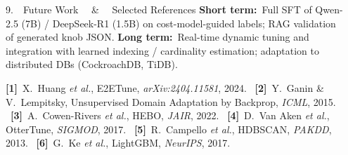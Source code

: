 \documentclass[final,t]{beamer}
\newlength{\sepwidth}
\newlength{\colwidth}
\newcommand{\sepcol}{\begin{column}{\sepwidth}\end{column}}
\begin{document}
\begin{frame}[t,fragile]
\begin{columns}[t]
\begin{column}{\colwidth}
\begin{block}{9.\ \ Future Work \ \ \& \ \ Selected References}
\small
\justifying
\textbf{Short term:}\ Full SFT of Qwen-2.5 (7B) / DeepSeek-R1 (1.5B) on cost-model-guided labels; RAG validation of generated knob JSON. \quad
\textbf{Long term:}\ Real-time dynamic tuning and integration with learned indexing / cardinality estimation; adaptation to distributed DBs (CockroachDB, TiDB).

\vspace{0.3em}
\fontsize{11}{13}\selectfont
\textbf{[1]}\ X.\ Huang \emph{et al.}, E2ETune, \emph{arXiv:2404.11581}, 2024. \ 
\textbf{[2]}\ Y.\ Ganin \& V.\ Lempitsky, Unsupervised Domain Adaptation by Backprop, \emph{ICML}, 2015. \
\textbf{[3]}\ A.\ Cowen-Rivers \emph{et al.}, HEBO, \emph{JAIR}, 2022. \
\textbf{[4]}\ D.\ Van Aken \emph{et al.}, OtterTune, \emph{SIGMOD}, 2017. \
\textbf{[5]}\ R.\ Campello \emph{et al.}, HDBSCAN, \emph{PAKDD}, 2013. \
\textbf{[6]}\ G.\ Ke \emph{et al.}, LightGBM, \emph{NeurIPS}, 2017.
\end{block}

\end{column}
\sepcol
\end{columns}

\end{frame}
\end{document}
